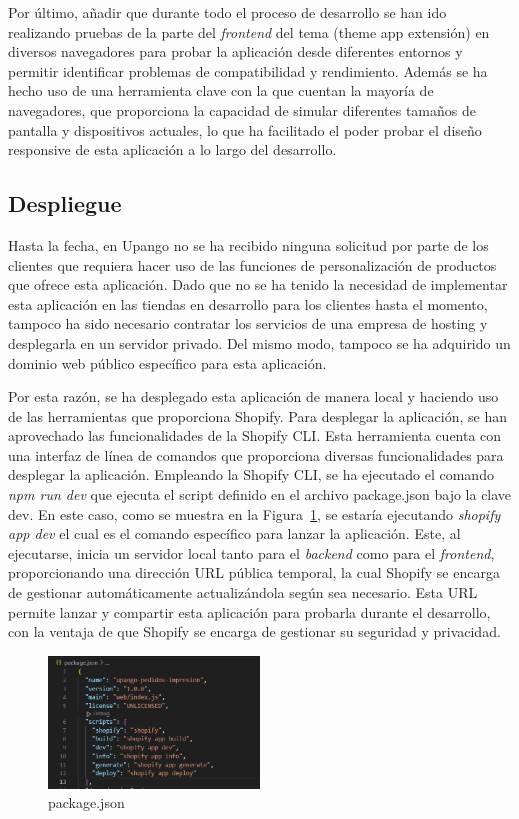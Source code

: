 \documentclass[11pt]{article}
\begin{document}
Por último, añadir que durante todo el proceso de desarrollo se han ido realizando pruebas de la parte del \textit{frontend} del tema (theme app extensión) en diversos
navegadores para probar la aplicación desde diferentes entornos y permitir identificar problemas de compatibilidad y rendimiento.
Además se ha hecho uso de una herramienta clave con la que cuentan la mayoría de navegadores, que proporciona la capacidad de simular diferentes 
tamaños de pantalla y dispositivos actuales, lo que ha facilitado el poder probar el diseño responsive de esta aplicación a lo largo del desarrollo.

\clearpage
\subsection{Despliegue}
Hasta la fecha, en Upango no se ha recibido ninguna solicitud por parte de los clientes que requiera hacer uso de las funciones de personalización de productos
que ofrece esta aplicación. Dado que no se ha tenido la necesidad de implementar esta aplicación en las tiendas en desarrollo para los clientes hasta el momento, tampoco ha sido 
necesario contratar los servicios de una empresa de hosting y desplegarla en un servidor privado. Del mismo modo, tampoco se ha adquirido un dominio web público 
específico para esta aplicación.

Por esta razón, se ha desplegado esta aplicación de manera local y haciendo uso de las herramientas que proporciona Shopify. Para desplegar la aplicación,
se han aprovechado las funcionalidades de la Shopify CLI. Esta herramienta cuenta con una interfaz de línea de comandos que proporciona diversas funcionalidades para desplegar la aplicación.
Empleando la Shopify CLI, se ha ejecutado el comando \textit{npm run dev} que ejecuta el script definido en el archivo package.json bajo la clave dev. En este caso, como se muestra en la Figura~\ref{fig:scriptsPackageJson}, se estaría ejecutando \textit{shopify app dev} el cual es el comando específico para lanzar la aplicación.
Este, al ejecutarse, inicia un servidor local tanto para el \textit{backend} como para el \textit{frontend}, proporcionando
una dirección URL pública temporal, la cual Shopify se encarga de gestionar automáticamente actualizándola según sea necesario. Esta URL permite lanzar y compartir esta aplicación para probarla durante el desarrollo, con la ventaja de que 
Shopify se encarga de gestionar su seguridad y privacidad.

\begin{figure}[H]
    \centering
    \includegraphics[width=0.5\textwidth]{imagenes/package.json.scripts.png}
    \caption{\label{fig:scriptsPackageJson}package.json}
    \vspace{\fill}
\end{figure}
\end{document}
